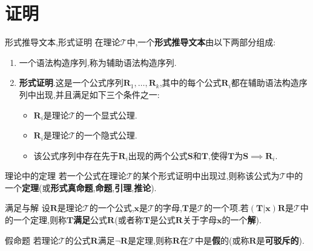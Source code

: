 \section{证明}

\begin{definition}{形式推导文本,形式证明}{}
	在理论$\mathcal{T}$中,一个\textbf{形式推导文本}由以下两部分组成:
	\begin{enumerate}
		\item 一个语法构造序列,称为辅助语法构造序列.
		\item \textbf{形式证明}.这是一个公式序列$\boldsymbol{R}_{1},\ldots,\boldsymbol{R}_{k}$,其中的每个公式$\boldsymbol{R}_{i}$都在辅助语法构造序列中出现,并且满足如下三个条件之一:
		\begin{itemize}
			\item $\boldsymbol{R}_{i}$是理论$\mathcal{T}$的一个显式公理.
			\item $\boldsymbol{R}_{i}$是理论$\mathcal{T}$的一个隐式公理.
			\item 该公式序列中存在先于$\boldsymbol{R}_{i}$出现的两个公式$\boldsymbol{S}$和$\boldsymbol{T}$,使得$\boldsymbol{T}$为$\boldsymbol{S}\implies\boldsymbol{R}_{i}$.
		\end{itemize}
	\end{enumerate}
\end{definition}

\begin{definition}{理论中的定理}{}
	若一个公式在理论$\mathcal{T}$的某个形式证明中出现过,则称该公式为$\mathcal{T}$中的一个\textbf{定理}(或\textbf{形式真命题},\textbf{命题},\textbf{引理},\textbf{推论}).
\end{definition}

\begin{definition}{满足与解}{}
	设$\boldsymbol{R}$是理论$\mathcal{T}$的一个公式,$\boldsymbol{x}$是$\mathcal{T}$的字母,$\boldsymbol{T}$是$\mathcal{T}$的一个项.若$\left(\boldsymbol{T}|\boldsymbol{x}\right)\boldsymbol{R}$是$\mathcal{T}$中的一个定理,则称$\boldsymbol{T}$\textbf{满足}公式$\boldsymbol{R}$(或者称$\boldsymbol{T}$是公式$\boldsymbol{R}$关于字母$\boldsymbol{x}$的一个\textbf{解}).		
\end{definition}

\begin{definition}{假命题}{}
	若理论$\mathcal{T}$的公式$\boldsymbol{R}$满足$\neg\boldsymbol{R}$是定理,则称$\boldsymbol{R}$在$\mathcal{T}$中是\textbf{假}的(或称$\boldsymbol{R}$是\textbf{可驳斥的}).
\end{definition}

